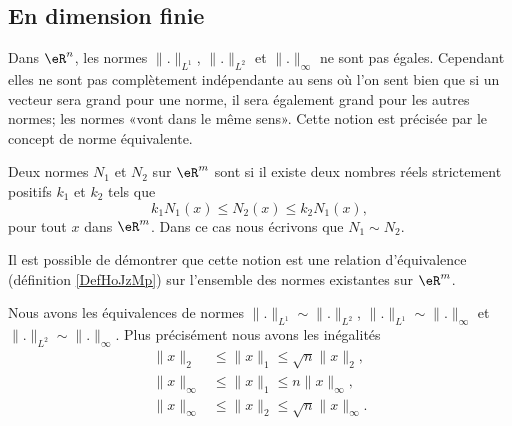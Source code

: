 \subsection{En dimension finie}

Dans $\eR^n$, les normes $\| . \|_{L^1}$, $\| . \|_{L^2}$ et $\| . \|_{\infty}$ ne sont pas égales. Cependant elles ne sont pas complètement indépendante au sens où l'on sent bien que si un vecteur sera grand pour une norme, il sera également grand pour les autres normes; les normes «vont dans le même sens». Cette notion est précisée par le concept de norme équivalente. 

\begin{definition}		\label{DefEquivNorm}
    Deux normes $N_1$ et $N_2$ sur $\eR^m$ sont  si il existe deux nombres réels strictement positifs $k_1$ et $k_2$ tels que
	\begin{equation}
		k_1N_1(x)\leq N_2(x)\leq k_2 N_1(x),
	\end{equation}
	pour tout $x$ dans $\eR^m$. Dans ce cas nous écrivons que $N_1\sim N_2$.
\end{definition}
Il est possible de démontrer que cette notion est une relation d'équivalence (définition \ref{DefHoJzMp}) sur l'ensemble des normes existantes sur $\eR^m$.

\begin{proposition}
    Nous avons les équivalences de normes $\| . \|_{L^1}\sim\| . \|_{L^2}$, $\| . \|_{L^1}\sim\| . \|_{\infty}$ et $\| . \|_{L^2}\sim\| . \|_{\infty}$. Plus précisément nous avons les inégalités
    \begin{subequations}
        \begin{align}
            \| x \|_2&\leq \| x \|_1\leq\sqrt{n}\| x \|_2,  \label{EqEquivdui}\\
            \| x \|_{\infty}&\leq \| x \|_1\leq n \| x \|_{\infty},\\
            \| x \|_{\infty}&\leq \| x \|_2\leq \sqrt{n}\| x \|_{\infty}.\label{EqEquivduiii}
        \end{align}
    \end{subequations}
\end{proposition}


